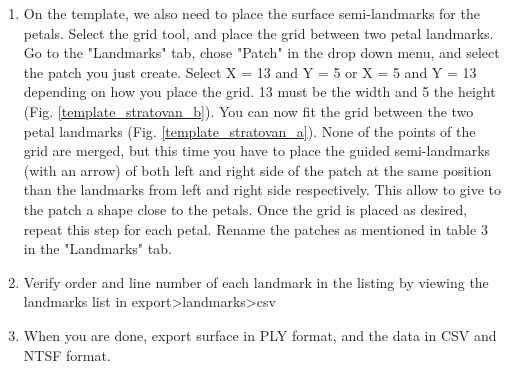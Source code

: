 \documentclass[10pt,letter,english]{article}
\begin{document}
\begin{enumerate}
\begin{enumerate}
        \item On the template, we also need to place the surface semi-landmarks for the petals. Select the grid tool, and place the grid between two petal landmarks. Go to the "Landmarks" tab, chose "Patch" in the drop down menu, and select the patch you just create. Select X = 13 and Y = 5 or X = 5 and Y = 13 depending on how you place the grid. 13 must be the width and 5 the height (Fig. \ref{template_stratovan_b}). You can now fit the grid between the two petal landmarks (Fig. \ref{template_stratovan_a}). None of the points of the grid are merged, but this time you have to place the guided semi-landmarks (with an arrow) of both left and right side of the patch at the same position than the landmarks from left and right side respectively. This allow to give to the patch a shape close to the petals. Once the grid is placed as desired, repeat this step for each petal. Rename the patches as mentioned in table 3 in the "Landmarks" tab.
        \item Verify order and line number of each landmark in the listing by viewing the landmarks list in export>landmarks>csv
        \item When you are done, export surface in PLY format, and the data in CSV and NTSF format.
       
    \end{enumerate}
\end{enumerate}
\end{document}
